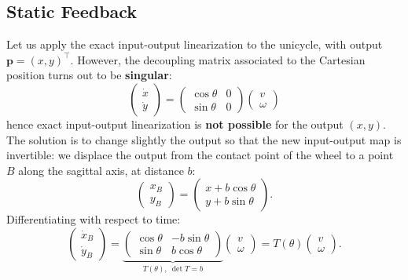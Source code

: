 \documentclass[10pt, a4paper]{report}
\begin{document}
\subsection{Static Feedback}
Let us apply the exact input-output linearization to the unicycle, with output $\mathbf p=(x,y)^\top$. However, the decoupling matrix associated to the Cartesian position turns out to be \textbf{singular}:\begin{equation}
    \begin{pmatrix}
        \dot x\\ \dot y
    \end{pmatrix}=\begin{pmatrix}
        \cos\theta&0\\\sin\theta&0
    \end{pmatrix}\begin{pmatrix}
        v\\ \omega
    \end{pmatrix}
\end{equation}
hence exact input-output linearization is \textbf{not possible} for the output $(x,y)$. The solution is to change slightly the output so that the new input-output map is invertible: we displace the output from the contact point of the wheel to a point $B$ along the sagittal axis, at distance $b$:\begin{equation}
    \begin{pmatrix}
        x_B\\ y_B
    \end{pmatrix}=\begin{pmatrix}
        x+b\cos\theta\\ y+b\sin\theta
    \end{pmatrix}.
\end{equation}
Differentiating with respect to time:\begin{equation}
    \begin{pmatrix}
        \dot x_B\\ \dot y_B
    \end{pmatrix}=\underbrace{\begin{pmatrix}
        \cos\theta&-b\sin\theta\\\sin\theta&b\cos\theta
    \end{pmatrix}}_{T(\theta),\ \det T=b}\begin{pmatrix}
        v\\ \omega
    \end{pmatrix}=T(\theta)\begin{pmatrix}
        v\\ \omega
    \end{pmatrix}.
\end{equation}
\end{document}
